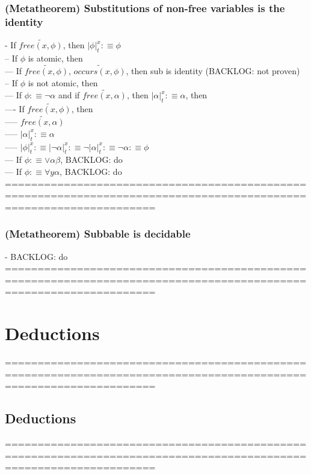 \documentclass{book}
\newcommand{\is}{:\equiv}
\newcommand{\pnot}[1]{\widetilde{#1}}
\newcommand{\occurs}[2]{occurs(#1, #2)}
\newcommand{\free}[2]{free(#1, #2)}
\newcommand{\sub}[3]{\left|#1\right|_{#3}^{#2}}
\begin{document}
\subsection{(Metatheorem) Substitutions of non-free variables is the identity} %
	- If $\pnot{\free{x}{\phi}}$, then $\sub{\phi}{x}{t} \is \phi$ \\
		-- If $\phi$ is atomic, then \\
			--- If $\pnot{\free{x}{\phi}}$, $\pnot{\occurs{x}{\phi}}$, then sub is identity (BACKLOG: not proven) \\
		-- If $\phi$ is not atomic, then \\
			--- If $\phi \is \lnot \alpha$ and if $\pnot{\free{x}{\alpha}}$, then $\sub{\alpha}{x}{t} \is \alpha$, then \\
				---- If $\pnot{\free{x}{\phi}}$, then \\
					----- $\pnot{\free{x}{\alpha}}$ \\
					----- $\sub{\alpha}{x}{t} \is \alpha$ \\
					----- $\sub{\phi}{x}{t} \is \sub{\lnot \alpha}{x}{t} \is \lnot \sub{\alpha}{x}{t} \is \lnot \alpha \is \phi$ \\
			--- If $\phi \is \lor \alpha \beta$, BACKLOG: do \\
			--- If $\phi \is \forall y \alpha$, BACKLOG: do \\
	===================================================================================================================
\subsection{(Metatheorem) Subbable is decidable} %
	- BACKLOG: do
	===================================================================================================================


\chapter{Deductions}
	===================================================================================================================
\section{Deductions}
	===================================================================================================================
\end{document}
